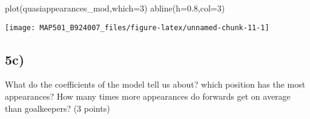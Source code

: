 \documentclass[
]{article}
\newenvironment{Shaded}{\begin{snugshade}}{\end{snugshade}}
\newcommand{\AttributeTok}[1]{\textcolor[rgb]{0.77,0.63,0.00}{#1}}
\newcommand{\DecValTok}[1]{\textcolor[rgb]{0.00,0.00,0.81}{#1}}
\newcommand{\FloatTok}[1]{\textcolor[rgb]{0.00,0.00,0.81}{#1}}
\newcommand{\FunctionTok}[1]{\textcolor[rgb]{0.00,0.00,0.00}{#1}}
\newcommand{\NormalTok}[1]{#1}
\begin{document}
\begin{Shaded}
\begin{Highlighting}[]
\FunctionTok{plot}\NormalTok{(quasiappearances\_mod,}\AttributeTok{which=}\DecValTok{3}\NormalTok{)}
\FunctionTok{abline}\NormalTok{(}\AttributeTok{h=}\FloatTok{0.8}\NormalTok{,}\AttributeTok{col=}\DecValTok{3}\NormalTok{)}
\end{Highlighting}
\end{Shaded}

\begin{center}\texttt{[image: MAP501\_B924007\_files/figure-latex/unnamed-chunk-11-1]} \end{center}

\hypertarget{c-4}{%
\subsection{5c)}\label{c-4}}

What do the coefficients of the model tell us about? which position has
the most appearances? How many times more appearances do forwards get on
average than goalkeepers? (3 points)
\end{document}
